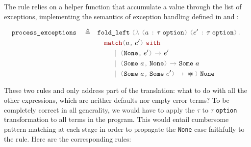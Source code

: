 \documentclass[11pt,a4paper]{article}
\newcommand{\synvar}[1]{\ensuremath{#1}}
\newcommand{\synkeyword}[1]{\textcolor{red!60!black}{\texttt{#1}}}
\newcommand{\synpunct}[1]{\textcolor{black!40!white}{\texttt{#1}}}
\newcommand{\syntyped}{~\synpunct{:}~}
\newcommand{\syncomma}{\synpunct{,}}
\newcommand{\syndot}{\synpunct{.}~}
\newcommand{\synlambda}{\synpunct{$\lambda$}~}
\newcommand{\synlparen}{\synpunct{(}}
\newcommand{\synrparen}{\synpunct{)}}
\newcommand{\synmid}{\synpunct{~$|$~}}
\newcommand{\synerror}{\synvar{\circledast}}
\newcommand{\synarrow}{~\synpunct{$\rightarrow$}~}
\newcommand{\synnone}{\texttt{None}}
\newcommand{\synsome}{\texttt{Some}~}
\newcommand{\synwith}{~\synkeyword{with}~}
\newcommand{\synoption}{\;\texttt{option}}
\begin{document}
The  rule relies on a helper function that accumulate a 
value through the list of exceptions, implementing the semantics of 
exception handling defined in  and
:

\begin{align*}
  \texttt{process\_exceptions}\quad&\triangleq&&
  \texttt{fold\_left}\;\synlparen\synlambda\synlparen\synvar{a}\syntyped
  \synvar{\tau}\synoption\synrparen\;
  \synlparen\synvar{e'}\syntyped
  \synvar{\tau}\synoption\synrparen\syndot\\
  &&&\quad\synkeyword{match}\synlparen\synvar{a}\syncomma\;\synvar{e'}\synrparen\synwith\\
  &&&\quad\quad\synmid\synlparen\synnone\syncomma\;\synvar{e'}\synrparen\synarrow\synvar{e'}\\
  &&&\quad\quad\synmid\synlparen\synsome\synvar{a}\syncomma\;\synnone\synrparen\synarrow
  \synsome\synvar{a}\\
  &&&\quad\quad\synmid\synlparen\synsome\synvar{a}\syncomma\;\synsome
  \synvar{e'}\synrparen\synarrow \synerror \synrparen\;\synnone
\end{align*}


These two rules  and  
only address part of the translation: what to do with all the 
other expressions, which are neither defaults nor empty error terms? To be 
completely correct in all generality, we would have to apply the \synvar{\tau}
to \synvar{\tau} \texttt{option} transformation to all terms in the 
program. This would entail cumbersome pattern matching at each stage in order 
to propagate the \verb|None| case faithfully to the 
rule. Here are the corresponding rules:
\end{document}
